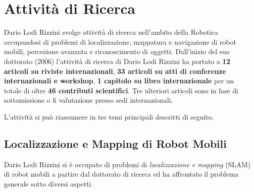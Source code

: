 \documentclass[11pt]{article}
\begin{document}

\section{Attivit\`a di Ricerca}

Dario Lodi Rizzini svolge attivit\`a di ricerca nell'ambito della Robotica occupandosi di problemi di localizzazione, mappatura e navigazione di robot mobili, percezione avanzata e riconoscimento di oggetti.
Dall'inizio del suo dottorato (2006) l'attivit\`a di ricerca di Dario Lodi Rizzini ha portato a 
\textbf{12 articoli su riviste internazionali}, 
\textbf{33 articoli su atti di conferenze internazionali e workshop},
\textbf{1 capitolo su libro internazionale} 
per un totale di oltre \textbf{46 contributi scientifici}.
Tre ulteriori articoli sono in fase di sottomissione o fi valutazione presso sedi internazionali.
 
L'attivit\`a si pu\`o riassumere in tre temi principali descritti di seguito.  

\subsection*{Localizzazione e Mapping di Robot Mobili}

Dario Lodi Rizzini si \`e occupato di problemi di  \emph{localizzazione e mapping} (SLAM) di robot mobili a partire dal dottorato di ricerca ed ha affrontato il problema generale sotto diversi aspetti.
\end{document}
